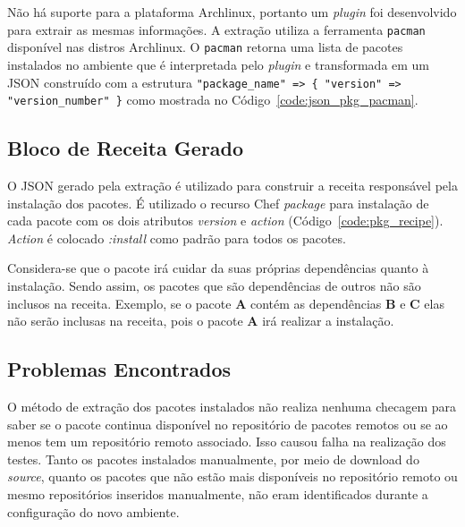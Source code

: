 Não há suporte para a plataforma Archlinux, portanto um \textit{plugin} foi desenvolvido
para extrair as mesmas informações. A extração utiliza a ferramenta \texttt{pacman} disponível
nas distros Archlinux. O \texttt{pacman} retorna uma lista de pacotes instalados no ambiente
que é interpretada pelo \textit{plugin} e transformada em um JSON construído com a estrutura
\texttt{"package\_name" => \{ "version" => "version\_number" \}} como mostrada no
Código~\ref{code:json_pkg_pacman}.

\noindent\begin{minipage}{\textwidth}
  \lstset{style=shell}
  
\end{minipage}\hfill

\subsection{Bloco de Receita Gerado}

O JSON gerado pela extração é utilizado para construir a receita responsável pela instalação dos
pacotes. É utilizado o recurso Chef \textit{package} para instalação de cada pacote com os dois atributos
\textit{version} e \textit{action} (Código~\ref{code:pkg_recipe}). \textit{Action} é colocado \textit{\textit{:install}}
como padrão para todos os pacotes.

\noindent\begin{minipage}{\textwidth}
  \lstset{style=shell}
  
\end{minipage}\hfill

Considera-se que o pacote irá cuidar da suas próprias dependências quanto à instalação.
Sendo assim, os pacotes que são dependências de outros não são inclusos na receita. Exemplo, se o pacote
\textbf{A} contém as dependências \textbf{B} e \textbf{C} elas não serão inclusas na receita, pois o pacote \textbf{A} irá realizar a instalação.

\subsection{Problemas Encontrados}

O método de extração dos pacotes instalados não realiza nenhuma checagem para
saber se o pacote continua disponível no repositório de pacotes remotos ou
se ao menos tem um repositório remoto associado. Isso causou falha na realização
dos testes. Tanto os pacotes instalados manualmente, por meio de download do
\textit{source}, quanto os pacotes que não estão mais disponíveis no repositório remoto ou
mesmo repositórios inseridos manualmente, não eram identificados durante a
configuração do novo ambiente.

